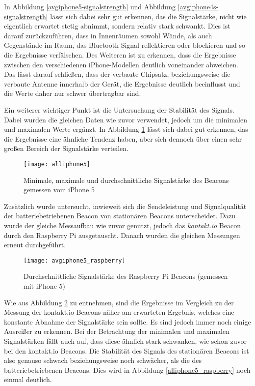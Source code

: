 In Abbildung \ref{avgiphone5-signalstrength} und Abbildung \ref{avgiphone4s-signalstrength} lässt sich dabei sehr gut erkennen, das die Signalstärke, nicht wie eigentlich erwartet stetig abnimmt, sondern relativ stark schwankt. Dies ist darauf zurückzuführen, dass in Innenräumen sowohl Wände, als auch Gegenstände im Raum, das Bluetooth-Signal reflektieren oder blockieren und so die Ergebnisse verfälschen.
Des Weiteren ist zu erkennen, dass die Ergebnisse zwischen den verschiedenen iPhone-Modellen deutlich voneinander abweichen. Das lässt darauf schließen, dass der verbaute Chipsatz, beziehungsweise die verbaute Antenne innerhalb der Gerät, die Ergebnisse deutlich beeinflusst und die Werte daher nur schwer übertragbar sind.

Ein weiterer wichtiger Punkt ist die Untersuchung der Stabilität des Signals. Dabei wurden die gleichen Daten wie zuvor verwendet, jedoch um die minimalen und maximalen Werte ergänzt. In Abbildung \ref{all-iphone5} lässt sich dabei gut erkennen, das die Ergebnisse eine ähnliche Tendenz haben, aber sich dennoch über einen sehr großen Bereich der Signalstärke verteilen.

\begin{figure}[htb!]
		\centering
	\texttt{[image: alliphone5]}
	\caption{Minimale, maximale und durchschnittliche Signalstärke des Beacons gemessen vom iPhone 5}
	\label{all-iphone5}
\end{figure}


Zusätzlich wurde untersucht, inwieweit sich die Sendeleistung und Signalqualität der batteriebetriebenen Beacon von stationären Beacons unterscheidet.
Dazu wurde der gleiche Messaufbau wie zuvor genutzt, jedoch das \emph{kontakt.io} Beacon durch den Raspberry Pi ausgetauscht. Danach wurden die gleichen Messungen erneut durchgeführt.

\begin{figure}[htb!]
		\centering
	\texttt{[image: avgiphone5\_raspberry]}
	\caption{Durchschnittliche Signalstärke des Raspberry Pi Beacons (gemessen mit iPhone 5)}
		\label{avgiphone5_raspberry}
\end{figure}

Wie aus Abbildung \ref{avgiphone5_raspberry} zu entnehmen, sind die Ergebnisse im Vergleich zu der Messung der kontakt.io Beacons näher am erwarteten Ergebnis, welches eine konstante Abnahme der Signalstärke sein sollte. Es sind jedoch immer noch einige Ausreißer zu erkennen. Bei der Betrachtung der minimalen und maximalen Signalstärken fällt auch auf, dass diese ähnlich stark schwanken, wie schon zuvor bei den kontakt.io Beacons. Die Stabilität des Signals des stationären Beacons ist also genauso schwach beziehungsweise noch schwächer, als die des batteriebetriebenen Beacons. Dies wird in Abbildung \ref{alliphone5_raspberry} noch einmal deutlich.

